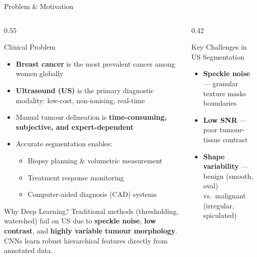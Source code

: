 \documentclass[aspectratio=169,10pt]{beamer}
\begin{document}
\begin{frame}{Problem \& Motivation}
  \begin{columns}[T]
    \begin{column}{0.55\textwidth}
      \begin{block}{Clinical Problem}
        \begin{itemize}
          \item \textbf{Breast cancer} is the most prevalent cancer among women globally
          \item \textbf{Ultrasound (US)} is the primary diagnostic modality:
                low-cost, non-ionising, real-time
          \item Manual tumour delineation is \textbf{time-consuming, subjective,
                and expert-dependent}
          \item Accurate segmentation enables:
          \begin{itemize}
            \item Biopsy planning \& volumetric measurement
            \item Treatment response monitoring
            \item Computer-aided diagnosis (CAD) systems
          \end{itemize}
        \end{itemize}
      \end{block}
      \vspace{4pt}
      \begin{alertblock}{Why Deep Learning?}
        Traditional methods (thresholding, watershed) fail on US due to
        \textbf{speckle noise}, \textbf{low contrast}, and \textbf{highly
        variable tumour morphology}. CNNs learn robust hierarchical features
        directly from annotated data.
      \end{alertblock}
    \end{column}
    \begin{column}{0.42\textwidth}
      \begin{exampleblock}{Key Challenges in US Segmentation}
        \begin{itemize}
          \item \textbf{Speckle noise} --- granular texture masks boundaries
          \item \textbf{Low SNR} --- poor tumour-tissue contrast
          \item \textbf{Shape variability} --- benign (smooth, oval) vs.\
                malignant (irregular, spiculated)

\end{itemize}
\end{exampleblock}
\end{column}
\end{columns}
\end{frame}
\end{document}
